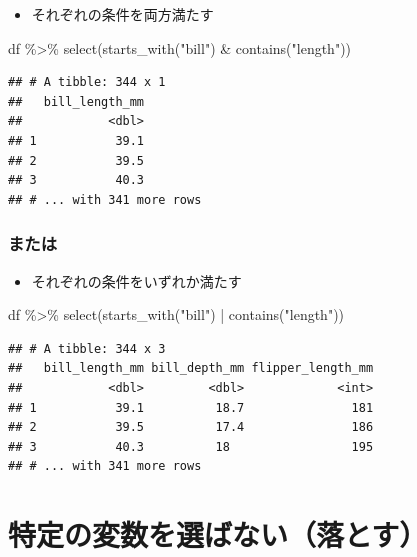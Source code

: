 \documentclass[
  xelatex,ja=standard, b5paper]{bxjsbook}
\newenvironment{Shaded}{\begin{snugshade}}{\end{snugshade}}
\newcommand{\FunctionTok}[1]{\textcolor[rgb]{0.00,0.00,0.00}{#1}}
\newcommand{\NormalTok}[1]{#1}
\newcommand{\SpecialCharTok}[1]{\textcolor[rgb]{0.00,0.00,0.00}{#1}}
\newcommand{\StringTok}[1]{\textcolor[rgb]{0.31,0.60,0.02}{#1}}
\providecommand{\tightlist}{%
  \setlength{\itemsep}{0pt}\setlength{\parskip}{0pt}}
\begin{document}
\begin{itemize}
\tightlist
\item
  それぞれの条件を両方満たす
\end{itemize}

\begin{Shaded}
\begin{Highlighting}[]
\NormalTok{df }\SpecialCharTok{\%\textgreater{}\%}
  \FunctionTok{select}\NormalTok{(}\FunctionTok{starts\_with}\NormalTok{(}\StringTok{"bill"}\NormalTok{) }\SpecialCharTok{\&} \FunctionTok{contains}\NormalTok{(}\StringTok{"length"}\NormalTok{))}
\end{Highlighting}
\end{Shaded}

\begin{verbatim}
## # A tibble: 344 x 1
##   bill_length_mm
##            <dbl>
## 1           39.1
## 2           39.5
## 3           40.3
## # ... with 341 more rows
\end{verbatim}

\hypertarget{select-helper5-2}{%
\subsubsection{または}\label{select-helper5-2}}

\begin{itemize}
\tightlist
\item
  それぞれの条件をいずれか満たす
\end{itemize}

\begin{Shaded}
\begin{Highlighting}[]
\NormalTok{df }\SpecialCharTok{\%\textgreater{}\%}
  \FunctionTok{select}\NormalTok{(}\FunctionTok{starts\_with}\NormalTok{(}\StringTok{"bill"}\NormalTok{) }\SpecialCharTok{|} \FunctionTok{contains}\NormalTok{(}\StringTok{"length"}\NormalTok{))}
\end{Highlighting}
\end{Shaded}

\begin{verbatim}
## # A tibble: 344 x 3
##   bill_length_mm bill_depth_mm flipper_length_mm
##            <dbl>         <dbl>             <int>
## 1           39.1          18.7               181
## 2           39.5          17.4               186
## 3           40.3          18                 195
## # ... with 341 more rows
\end{verbatim}

\hypertarget{select-drop}{%
\section{特定の変数を選ばない（落とす）}\label{select-drop}}
\end{document}
